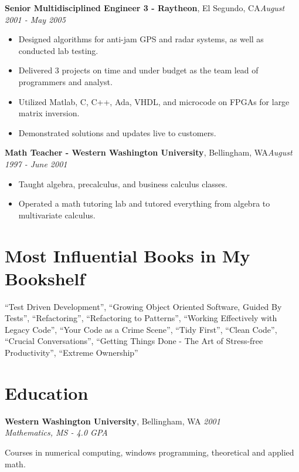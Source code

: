 \documentclass[letter,11pt]{article}
\newenvironment{noindentblock}{%
  \begin{list}{}{%
    \setlength{\leftmargin}{0in} %
    \setlength{\rightmargin}{.25in} %
    \setlength{\topsep}{0pt} %
    \setlength{\parsep}{0pt} %
  }
  \item[]}{\end{list}}
\begin{document}
\pagebreak
\noindent
\textbf{Senior Multidisciplined Engineer 3 - Raytheon}, El Segundo, CA\hfill \textit{August 2001 - May 2005}
\begin{itemize}[leftmargin=*,itemsep=0pt, parsep=0pt,label=$\diamond$]
\item Designed algorithms for anti-jam GPS and radar systems, as well as conducted lab testing.
\item Delivered 3 projects on time and under budget as the team lead of programmers and analyst.
\item Utilized Matlab, C, C++, Ada, VHDL, and microcode on FPGAs for large matrix inversion.
\item Demonstrated solutions and updates live to customers.
\end{itemize}

\noindent
\textbf{Math Teacher - Western Washington University}, Bellingham, WA\hfill \textit{August 1997 - June 2001}
\begin{itemize}[leftmargin=*,itemsep=0pt, parsep=0pt,label=$\diamond$]
\item Taught algebra, precalculus, and business calculus classes.
\item Operated a math tutoring lab and tutored everything from algebra to multivariate calculus.
\end{itemize}

\section*{Most Influential Books in My  Bookshelf}
``Test Driven Development'', ``Growing Object Oriented Software, Guided By Tests'', ``Refactoring'', ``Refactoring to Patterns'', ``Working Effectively with Legacy Code'', ``Your Code as a Crime Scene'', ``Tidy First'', ``Clean Code'', ``Crucial Conversations'', ``Getting Things Done - The Art of Stress-free Productivity'', ``Extreme Ownership''

\section*{Education}

\noindent
\textbf{Western Washington University}, Bellingham, WA \hfill \textit{2001}\\
\textit{Mathematics, MS - 4.0 GPA} 
\begin{noindentblock}
Courses in numerical computing, windows programming, theoretical and applied math.
\end{noindentblock}
\end{document}
